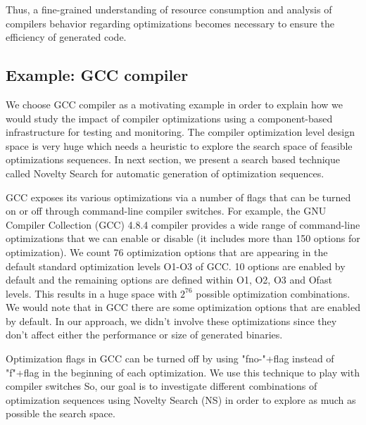 Thus, a fine-grained understanding of resource
consumption and analysis of compilers behavior regarding
optimizations becomes necessary to ensure the efficiency of generated code.

\subsection{Example: GCC compiler}
We choose GCC compiler as a motivating example in order to explain how we would study the impact of compiler optimizations using a component-based infrastructure for testing and monitoring.
The compiler optimization level design space is very huge which needs a heuristic to explore the search space of feasible optimizations sequences. In next section, we present a search based technique called Novelty Search for automatic generation of optimization sequences. 

GCC exposes its various optimizations via a number of flags that can be turned on or off through command-line compiler switches. For example, the GNU Compiler Collection (GCC) 4.8.4 compiler provides a wide range of command-line optimizations that we can enable or disable (it includes more than 150 options for optimization). We count 76 optimization options that are appearing in the default standard optimization levels O1-O3 of GCC. 10 options are enabled by default and the remaining options are defined within O1, O2, O3 and Ofast levels.
This results in a huge space with $2^{76}$ possible optimization
combinations.
We would note that in GCC there are some optimization options that are enabled by default. In our approach, we didn't involve these optimizations since they don't affect either the performance or size of generated binaries.

Optimization flags in GCC can be turned off by using "fno-"+flag instead of "f"+flag in the beginning of each optimization. We use this technique to play with compiler switches
So, our goal is to investigate different combinations of optimization sequences using Novelty Search (NS) in order to explore as much as possible the search space. 

